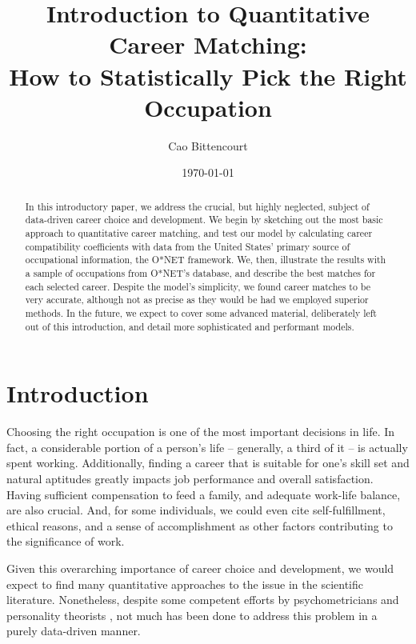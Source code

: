 \documentclass{article}
\title{Introduction to Quantitative Career Matching:
\\How to Statistically Pick the Right Occupation}
\author{Cao Bittencourt}
\date{\today}
\begin{document}
\maketitle

\newpage

\begin{abstract}
In this introductory paper, we address the crucial, but highly neglected, subject of data-driven career choice and development. We begin by sketching out the most basic approach to quantitative career matching, and test our model by calculating career compatibility coefficients with data from the United States' primary source of occupational information, the O*NET framework. We, then, illustrate the results with a sample of occupations from O*NET's database, and describe the best matches for each selected career. Despite the model's simplicity, we found career matches to be very accurate, although not as precise as they would be had we employed superior methods. In the future, we expect to cover some advanced material, deliberately left out of this introduction, and detail more sophisticated and performant models.
\end{abstract}

\newpage
\tableofcontents

\newpage
\listoftables

\newpage
\section{Introduction}
Choosing the right occupation is one of the most important decisions in life. In fact, a considerable portion of a person's life -- generally, a third of it -- is actually spent working. Additionally, finding a career that is suitable for one's skill set and natural aptitudes greatly impacts job performance and overall satisfaction. Having sufficient compensation to feed a family, and adequate work-life balance, are also crucial. And, for some individuals, we could even cite self-fulfillment, ethical reasons, and a sense of accomplishment as other factors contributing to the significance of work.

Given this overarching importance of career choice and development, we would expect to find many quantitative approaches to the issue in the scientific literature. Nonetheless, despite some competent efforts by psychometricians and personality theorists 
\parencites[e.g.][]{holland1959theory, holland1997making}{schein1978careerdynamics, schein1993careeranchors}, not much has been done to address this problem in a purely data-driven manner.
\end{document}
